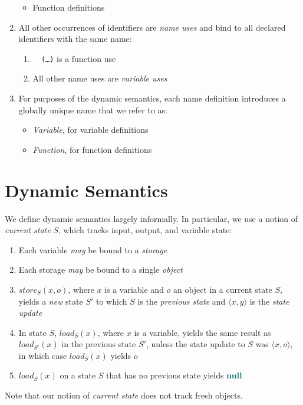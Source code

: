 \documentclass{article}
\newcommand{\ulm}[1]{%
  \uline{\phantom{#1}}%
  \llap{\contour{white}{#1}}%
}
\newcommand{\tuple}[1]{\ensuremath{\langle #1 \rangle}}
\newcommand{\code}[1]{\texttt{\textcolor{dgreen}{#1}}}
\newcommand{\Vnull}[0]{\textbf{\textcolor{dcyan}{null}}}
\begin{document}
\begin{enumerate}
\begin{itemize}
    \item Function definitions
    \end{itemize}
  \item All other occurrences of identifiers are \emph{name uses} and bind to all declared identifiers with the same name:
    \begin{enumerate}
    \item \code{\ulm{f} (\ldots)} is a function use
    \item All other name uses are \emph{variable uses}
    \end{enumerate}
  \item For purposes of the dynamic semantics, each name definition introduces a globally unique name that we refer to as:
    \begin{itemize}
    \item \emph{Variable}, for variable definitions
    \item \emph{Function}, for function definitions
    \end{itemize}
\end{enumerate}

\section{Dynamic Semantics}

We define dynamic semantics largely informally.  In particular, we use
a notion of \emph{current state} $S$, which tracks input, output, and variable state:
\begin{enumerate}
\item Each variable \emph{may} be bound to a \emph{storage}
\item Each storage \emph{may} be bound to a single \emph{object}
\item $\textit{store}_S(x, o)$, where $x$ is a variable and $o$ an object in a current state $S$, yields a \emph{new} state $S'$ to which $S$ is the \emph{previous state} and $\tuple{x,y}$ is the \emph{state update}
\item In state $S$, $\textit{load}_S(x)$, where $x$ is a variable, yields the same result as $\textit{load}_{S'}(x)$ in the previous state $S'$, unless the state update to $S$ was $\tuple{x, o}$, in which case $\textit{load}_{S}(x)$ yields $o$
\item $\textit{load}_S(x)$ on a state $S$ that has no previous state yields $\Vnull$
\end{enumerate}
Note that our notion of \emph{current state} does not track fresh objects.
\end{document}
